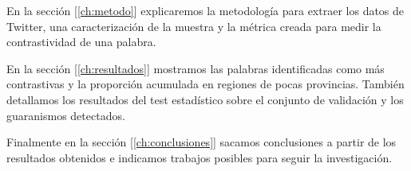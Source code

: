 En la sección [\ref{ch:metodo}]
explicaremos la metodología para extraer los datos de Twitter, una caracterización de la muestra y la métrica creada para medir la contrastividad de una palabra.

En la sección [\ref{ch:resultados}] mostramos las palabras identificadas como más contrastivas y la proporción acumulada en regiones de pocas provincias. También detallamos los resultados del test estadístico sobre el conjunto de validación y los guaranismos detectados. 

Finalmente en la sección [\ref{ch:conclusiones}] sacamos conclusiones a partir de los resultados obtenidos e indicamos trabajos posibles para seguir la investigación.
